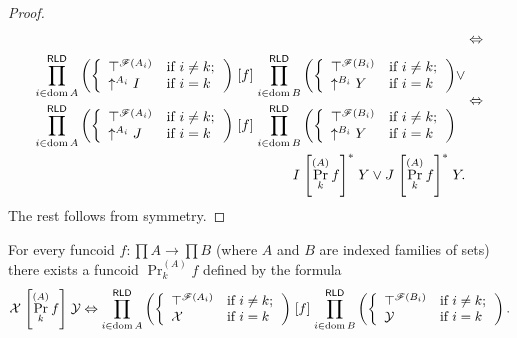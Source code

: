 \begin{proof}
\begin{align*}
\begin{aligned}
\end{aligned}
 & \Leftrightarrow\\
\begin{aligned}\prod_{i\in\operatorname{dom} A}^{\mathsf{RLD}}\left(\left\{ \begin{array}{ll}
\top^{\mathscr{F}(A_{i})} & \text{if }i\neq k;\\
\uparrow^{A_{i}}I & \text{if }i=k
\end{array}\right.\right)\mathrel{\left[f\right]}\prod_{i\in\operatorname{dom} B}^{\mathsf{RLD}}\left(\left\{ \begin{array}{ll}
\top^{\mathscr{F}(B_{i})} & \text{if }i\neq k;\\
\uparrow^{B_{i}}Y & \text{if }i=k
\end{array}\right.\right) & \lor\\
\prod_{i\in\operatorname{dom} A}^{\mathsf{RLD}}\left(\left\{ \begin{array}{ll}
\top^{\mathscr{F}(A_{i})} & \text{if }i\neq k;\\
\uparrow^{A_{i}}J & \text{if }i=k
\end{array}\right.\right)\mathrel{\left[f\right]}\prod_{i\in\operatorname{dom} B}^{\mathsf{RLD}}\left(\left\{ \begin{array}{ll}
\top^{\mathscr{F}(B_{i})} & \text{if }i\neq k;\\
\uparrow^{B_{i}}Y & \text{if }i=k
\end{array}\right.\right)
\end{aligned}
 & \Leftrightarrow\\
I\mathrel{\left[\Pr_{k}^{(A)}f\right]^{\ast}}Y\lor J\mathrel{\left[\Pr_{k}^{(A)}f\right]^{\ast}}Y.
\end{align*}
The rest follows from symmetry.\end{proof}
\begin{prop}
For every funcoid $f:\prod A\rightarrow\prod B$ (where $A$ and $B$
are indexed families of sets) there exists a funcoid $\Pr_{k}^{(A)}f$
defined by the formula 
\[
\mathcal{X}\mathrel{\left[\Pr_{k}^{(A)}f\right]}\mathcal{Y}\Leftrightarrow\prod_{i\in\operatorname{dom} A}^{\mathsf{RLD}}\left(\left\{ \begin{array}{ll}
\top^{\mathscr{F}(A_{i})} & \text{if }i\neq k;\\
\mathcal{X} & \text{if }i=k
\end{array}\right.\right)\mathrel{\left[f\right]}\prod_{i\in\operatorname{dom} B}^{\mathsf{RLD}}\left(\left\{ \begin{array}{ll}
\top^{\mathscr{F}(B_{i})} & \text{if }i\neq k;\\
\mathcal{Y} & \text{if }i=k
\end{array}\right.\right).
\]
\end{prop}
